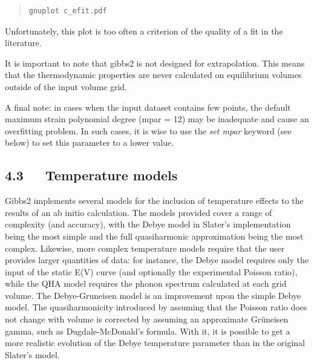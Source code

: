 \documentclass[a4paper]{article}
\begin{document}
\begin{quote}
\begin{verbatim}
gnuplot c_efit.pdf
\end{verbatim}
\end{quote}

\noindent{}

Unfortunately, this plot is too often a criterion of the quality of a
fit in the literature.

It is important to note that gibbs2 is not designed for
extrapolation. This means that the thermodynamic properties are never
calculated on equilibrium volumes outside of the input volume grid.

A final note: in cases when the input dataset contains few points, the
default maximum strain polynomial degree (mpar = 12) may be inadequate
and cause an overfitting problem. In such cases, it is wise to use the
\emph{set mpar} keyword (see below) to set this parameter to a lower
value.


\subsection{4.3   Temperature models%
  \label{temperature-models}%
}

Gibbs2 implements several models for the inclusion of temperature
effects to the results of an ab initio calculation. The models
provided cover a range of complexity (and accuracy), with the Debye
model in Slater's implementation being the most simple and the full
quasiharmonic approximation being the most complex. Likewise, more
complex temperature models require that the user provides larger
quantities of data: for instance, the Debye model requires only the
input of the static E(V) curve (and optionally the experimental
Poisson ratio), while the QHA model requires the phonon spectrum
calculated at each grid volume. The Debye-Gruneisen model is an
improvement upon the simple Debye model. The quasiharmonicity
introduced by assuming that the Poisson ratio does not change with
volume is corrected by assuming an approximate Grüneisen gamma, such
as Dugdale-McDonald's formula. With it, it is possible to get a more
realistic evolution of the Debye temperature parameter than in the
original Slater's model.
\end{document}
